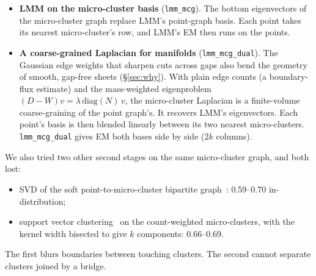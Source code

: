 \documentclass[11pt,a4paper]{article}
\newcommand{\code}[1]{\texttt{#1}}
\begin{document}
\begin{itemize}
  built coarse-to-fine: a $k$-means with about $2\sqrt m$ centres, then local
  splits in proportion to each coarse cluster's size, as in BIRCH's CF
  tree~\cite{zhang1996birch}. Each edge's bandwidth then comes from the two
  micro-clusters' own spread, read from their clustering-feature triples
  $(N, \mathrm{LS}, \mathrm{SS})$ as $R^2 = \mathrm{SS}/N - \|\mathrm{LS}/N\|^2$:
  \[
    w_{ij} = \mathrm{count}_{ij}\,
    \exp\!\big(-\|c_i-c_j\|^2 / \gamma(R_i^2+R_j^2)\big),
  \]
  a locally scaled affinity in the sense of self-tuning spectral
  clustering~\cite{zelnikmanor2004self}. The parts fix opposite failures:
  \begin{itemize}
    \item tiers alone fix small real data (breast cancer
    $0.24 \to 0.45$) but break extreme outliers ($0.56 \to 0.27$);
    \item CF weights alone fix outliers (0.81) but not small data.
  \end{itemize}
  Multi-resolution anchor graphs~\cite{liu2010large,huang2020ultra} are the
  closest prior work.
  \item \textbf{LMM on the micro-cluster basis} (\code{lmm\_mcg}). The bottom
  eigenvectors of the micro-cluster graph replace LMM's point-graph basis. Each
  point takes its nearest micro-cluster's row, and LMM's EM then runs on the
  points.
  \item \textbf{A coarse-grained Laplacian for manifolds}
  (\code{lmm\_mcg\_dual}). The Gaussian edge weights that sharpen cuts across
  gaps also bend the geometry of smooth, gap-free sheets
  (\S\ref{sec:why}). With plain edge counts (a boundary-flux estimate) and
  the mass-weighted eigenproblem $(D - W)v = \lambda\,\mathrm{diag}(N)\,v$,
  the micro-cluster Laplacian is a finite-volume coarse-graining of the point
  graph's. It recovers LMM's eigenvectors. Each point's basis is then blended
  linearly between its two nearest micro-clusters. \code{lmm\_mcg\_dual}
  gives EM both bases side by side ($2k$ columns).
\end{itemize}
We also tried two other second stages on the same micro-cluster graph, and
both lost:
\begin{itemize}
  \item SVD of the soft point-to-micro-cluster bipartite
  graph~\cite{liu2010large}: 0.59--0.70 in-distribution;
  \item support vector clustering~\cite{benhur2001support} on the
  count-weighted micro-clusters, with the kernel width bisected to give $k$
  components: 0.66--0.69.
\end{itemize}
The first blurs boundaries between touching clusters. The second cannot
separate clusters joined by a bridge.
\end{document}
